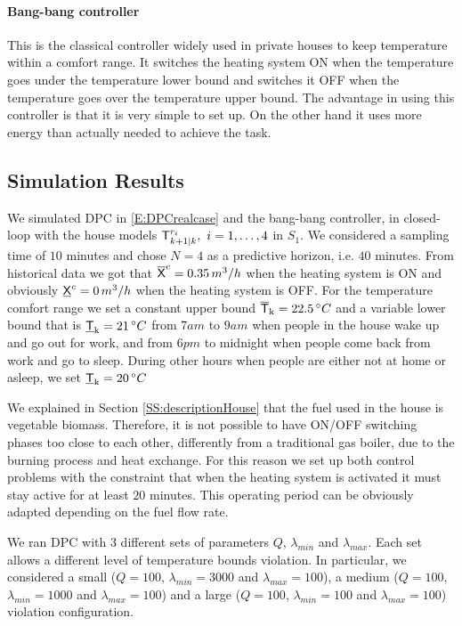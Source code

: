 \paragraph{Bang-bang controller}
This is the classical controller widely used in private houses to keep temperature within a comfort range. It switches the heating system ON when the temperature goes under the temperature lower bound and switches it OFF when the temperature goes over the temperature upper bound. The advantage in using this controller is that it is very simple to set up. On the other hand it uses more energy than actually needed to achieve the task.

\subsection{Simulation Results}\label{SS:simulationResults} We simulated  DPC in \eqref{E:DPCrealcase} and the bang-bang controller, in closed-loop with the house models $\mathsf{T}^{r_i}_{k+1|k},\ i=1,\ldots,4$ in $S_1$. We considered a sampling time of $10$ minutes and chose $N=4$ as a predictive horizon, i.e. $40$ minutes. From historical data we got that $\overline{\mathsf{X}}^c = 0.35 \, m^3/h$ when the heating system is ON and obviously $\underline{\mathsf{X}}^c = 0 \, m^3/h$ when the heating system is OFF. For the temperature comfort range we set a constant upper bound $\overline{\mathsf{T}}_{\mathrm{k}} = 22.5 \, \degree C$ and a variable lower bound that is $\underline{\mathsf{T}}_{\mathrm{k}} = 21 \, \degree C$ from $7am$ to $9am$ when people in the house wake up and go out for work, and from $6pm$ to midnight when people come back from work and go to sleep. During other hours when people are either not at home or asleep, we set $\underline{\mathsf{T}}_{\mathrm{k}} = 20 \, \degree C$ 

We explained in Section \ref{SS:descriptionHouse} that the fuel used in the house is vegetable biomass. Therefore, it is not possible to have ON/OFF switching phases too close to each other, differently from a traditional gas boiler, due to the burning process and heat exchange. For this reason we set up both control problems with the constraint that when the heating system is activated it must stay active for at least $20$ minutes. This operating period can be obviously adapted depending on the fuel flow rate.

We ran DPC with $3$ different sets of parameters $Q$, $\lambda_{min}$ and $\lambda_{max}$. Each set allows a different level of temperature bounds violation. In particular, we considered a small ($Q=100$, $\lambda_{min}=3000$ and $\lambda_{max}=100$), a medium ($Q=100$, $\lambda_{min}=1000$ and $\lambda_{max}=100$) and a large ($Q=100$, $\lambda_{min}=100$ and $\lambda_{max}=100$) violation configuration.

